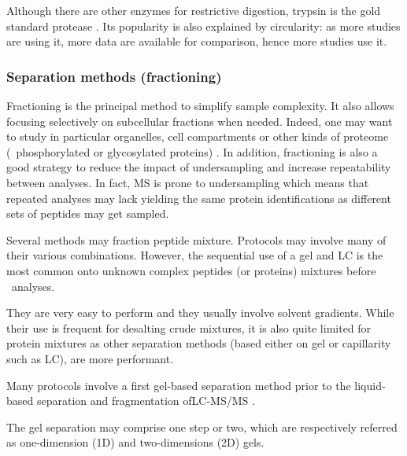 Although there are other enzymes for restrictive digestion, trypsin is the gold
standard protease . Its popularity is also explained by
circularity: as more studies are using it, more data are available for comparison,
hence more studies use it.

\subsubsection{Separation methods (fractioning)}\label{subsub:sepMethods}
Fractioning is the principal method to simplify sample complexity. It also allows
focusing selectively on subcellular fractions when needed. Indeed, one may want
to study in particular organelles, cell compartments or other kinds of proteome
(\eg\ phosphorylated or glycosylated proteins) . In addition,
fractioning is also a good strategy to reduce the impact of undersampling and
increase repeatability between analyses. In fact, \gls{MS} is prone to
undersampling which means that repeated analyses may lack yielding the same
protein identifications as different sets of peptides may get sampled.

Several methods may fraction peptide mixture. Protocols may involve many of their
various combinations. However, the sequential use of a gel and \gls{LC} is
the most common onto unknown complex peptides (or proteins) mixtures before
\ms\ analyses.

They are very easy to perform and they usually involve solvent gradients. While
their use is frequent for desalting crude mixtures, it is also quite limited
for protein mixtures as other separation methods (based either on gel or
capillarity such as \gls{LC}), are more performant.

Many protocols involve a first gel-based separation method prior to the
liquid-based separation and fragmentation of\enspace\gls{LC-MS/MS}
.

The gel separation may comprise one step or two, which are respectively referred
as one-dimension (1D) and two-dimensions (2D) gels.


